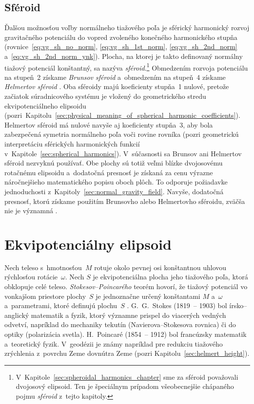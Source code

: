\documentclass[a4paper, 12pt]{book}
\begin{document}
\subsection{Sféroid}
\label{sec:normal_field_spheroid}

Ďalšou možnosťou voľby normálneho tiažového poľa je sférický harmonický rozvoj 
gravitačného potenciálu do vopred zvoleného konečného harmonického stupňa 
(rovnice~\ref{eq:vg_sh_no_norm}, \ref{eq:vg_sh_1st_norm}, 
\ref{eq:vg_sh_2nd_norm} a~\ref{eq:vg_sh_2nd_norm_ynk}).  Plocha, na ktorej je 
takto definovaný normálny tiažový potenciál konštantný, sa nazýva 
\emph{sféroid}.\footnote{V~Kapitole~\ref{sec:spheroidal_harmonics_chapter} sme 
za sféroid považovali dvojosový elipsoid.  Ten je špeciálnym prípadom 
všeobecnejšie chápaného pojmu \emph{sféroid} z~tejto kapitoly.}  Obmedzením 
rozvoja potenciálu na stupeň~2 získame \emph{Brunsov sféroid} a~obmedzením na 
stupeň~4 získame \emph{Helmertov sféroid} \parencite{Moritz1967}.  Oba sféroidy 
majú koeficienty stupňa~1 nulové, pretože začiatok súradnicového systému je 
vložený do geometrického stredu ekvipotenciálneho elipsoidu 
(pozri~Kapitolu~\ref{sec:physical_meaning_of_spherical_harmonic_coefficients}).  
Helmertov sféroid má nulové navyše aj koeficienty stupňa~3, aby bola 
zabezpečená symetria normálneho poľa voči rovine rovníka (pozri geometrickú 
interpretáciu sférických harmonických funkcií 
v~Kapitole~\ref{sec:spherical_harmonics}).   V~súčasnosti sa Brunsov ani 
Helmertov sféroid nezvyknú používať.  Obe plochy sú totiž veľmi blízke 
dvojosovému rotačnému elipsoidu a~dodatočná presnosť je získaná za cenu výrazne 
náročnejšieho matematického popisu oboch plôch.  To odporuje požiadavke 
jednoduchosti z~Kapitoly~\ref{sec:normal_gravity_field}.  Navyše, dodatočná 
presnosť, ktorú získame použitím Brunsovho alebo Helmertovho sféroidu, zväčša 
nie je významná \parencite{Moritz1967}.



\section{Ekvipotenciálny elipsoid}
\label{sec:equipotential_ellipsoid}

Nech teleso s~hmotnosťou~$M$ rotuje okolo pevnej osi konštantnou uhlovou 
rýchlosťou rotácie~$\omega$.  Nech $S$ je ekvipotenciálna plocha jeho tiažového 
poľa, ktorá obklopuje celé teleso.  \emph{Stokesov--Poincarého} teorém hovorí, 
že tiažový potenciál vo vonkajšom priestore plochy~$S$ je jednoznačne určený 
konštantami $M$ a~$\omega$ a~parametrami, ktoré definujú plochu~$S$ 
\parencite{TorgeGeodesy}.  G.~G.~Stokes (1819~-- 1903) bol írsko--anglický 
matematik a fyzik, ktorý významne prispel do viacerých vedných odvetví, 
napríklad do mechaniky tekutín (Navierova--Stokesova rovnica) či do optiky 
(polarizácia svetla).  H.~Poincaré (1854~-- 1912) bol francúzsky matematik 
a~teoretický fyzik.  V~geodézii je známy napríklad pre redukciu tiažového 
zrýchlenia z~povrchu Zeme dovnútra Zeme (pozri 
Kapitolu~\ref{sec:helmert_height}).
\end{document}
